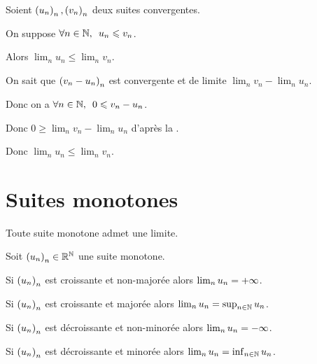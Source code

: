 \begin{theo}
Soient \(\left(u_n\right)_n,\left(v_n\right)_n\) deux suites convergentes.

On suppose \(\quantifs{\forall n\in\N}u_n\leq v_n\).

Alors \(\lim_nu_n\leq\lim_nv_n\).
\end{theo}

\begin{dem}
On sait que \(\left(v_n-u_n\right)_n\) est convergente et de limite \(\lim_nv_n-\lim_nu_n\).

Donc on a \(\quantifs{\forall n\in\N}0\leq v_n-u_n\).

Donc \(0\geq\lim_nv_n-\lim_nu_n\) d'après la .

Donc \(\lim_nu_n\leq\lim_nv_n\).
\end{dem}

\section{Suites monotones}

\begin{theo}
Toute suite monotone admet une limite.

Soit \(\left(u_n\right)_n\in\mathbb{R}^{\mathbb{N}}\) une suite monotone.

Si \(\left(u_n\right)_n\) est croissante et non-majorée alors \(\lim_nu_n=+\infty\).

Si \(\left(u_n\right)_n\) est croissante et majorée alors \(\lim_nu_n=\sup_{n\in\mathbb{N}}u_n\).

Si \(\left(u_n\right)_n\) est décroissante et non-minorée alors \(\lim_nu_n=-\infty\).

Si \(\left(u_n\right)_n\) est décroissante et minorée alors \(\lim_nu_n=\inf_{n\in\mathbb{N}}u_n\).
\end{theo}

